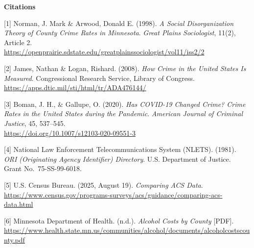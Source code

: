 \documentclass[
  11pt,
  letterpaper,
  DIV=11,
  numbers=noendperiod]{scrartcl}
\begin{document}
\textbf{Citations}

{[}1{]} Norman, J. Mark \& Arwood, Donald E. (1998). \emph{A Social
Disorganization Theory of County Crime Rates in Minnesota}. \emph{Great
Plains Sociologist}, 11(2), Article 2.\\
\url{https://openprairie.sdstate.edu/greatplainssociologist/vol11/iss2/2}

{[}2{]} James, Nathan \& Logan, Rishard. (2008). \emph{How Crime in the
United States Is Measured}. Congressional Research Service, Library of
Congress.\\
\url{https://apps.dtic.mil/sti/html/tr/ADA476144/}

{[}3{]} Boman, J. H., \& Gallupe, O. (2020). \emph{Has COVID-19 Changed
Crime? Crime Rates in the United States during the Pandemic}.
\emph{American Journal of Criminal Justice}, 45, 537--545.\\
\url{https://doi.org/10.1007/s12103-020-09551-3}

{[}4{]} National Law Enforcement Telecommunications System (NLETS).
(1981). \emph{ORI (Originating Agency Identifier) Directory}. U.S.
Department of Justice. Grant No.~75-SS-99-6018.

{[}5{]} U.S. Census Bureau. (2025, August 19). \emph{Comparing ACS
Data}.\\
\url{https://www.census.gov/programs-surveys/acs/guidance/comparing-acs-data.html}

{[}6{]} Minnesota Department of Health. (n.d.). \emph{Alcohol Costs by
County} {[}PDF{]}.\\
\url{https://www.health.state.mn.us/communities/alcohol/documents/alcoholcostscounty.pdf}
\end{document}
